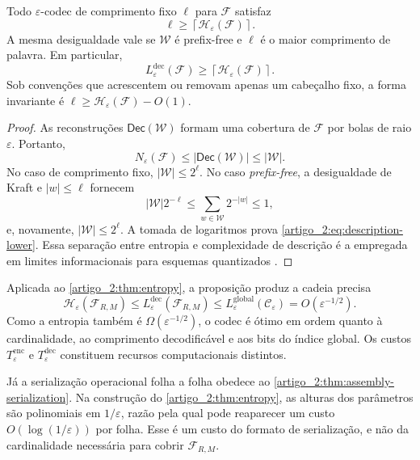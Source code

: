 \begin{proposition}\label{map:artigo_2:3.20}
\label{artigo_2:prop:description-lower}
Todo $\varepsilon$-codec de comprimento fixo $\ell$ para $\mathcal F$ satisfaz
\begin{equation}
 \ell\ge\left\lceil\mathcal H_\varepsilon(\mathcal F)\right\rceil.
 \label{artigo_2:eq:description-lower}
\end{equation}
A mesma desigualdade vale se $\mathcal W$ é prefix-free e $\ell$ é o maior
comprimento de palavra. Em particular,
\[
 L_\varepsilon^{\mathrm{dec}}(\mathcal F)
 \ge\left\lceil\mathcal H_\varepsilon(\mathcal F)\right\rceil.
\]
Sob convenções que acrescentem ou removam apenas um cabeçalho fixo, a forma
invariante é $\ell\ge\mathcal H_\varepsilon(\mathcal F)-O(1)$.
\end{proposition}

\begin{proof}
As reconstruções $\mathsf{Dec}(\mathcal W)$ formam uma cobertura de
$\mathcal F$ por bolas de raio $\varepsilon$. Portanto,
\[
 N_\varepsilon(\mathcal F)
 \le |\mathsf{Dec}(\mathcal W)|\le|\mathcal W|.
\]
No caso de comprimento fixo, $|\mathcal W|\le2^\ell$. No caso \emph{prefix-free}, a
desigualdade de Kraft e $|w|\le\ell$ fornecem
\[
 |\mathcal W|2^{-\ell}
 \le\sum_{w\in\mathcal W}2^{-|w|}\le1,
\]
e, novamente, $|\mathcal W|\le2^\ell$. A tomada de logaritmos prova
\eqref{artigo_2:eq:description-lower}. Essa separação entre entropia e complexidade de
descrição é a empregada em limites informacionais para esquemas quantizados
\citep{artigo_1-bolcskei2019}.
\end{proof}

Aplicada ao \cref{artigo_2:thm:entropy}, a proposição produz a cadeia precisa
\begin{equation}
 \mathcal H_\varepsilon(\mathcal F_{R,M})
 \le L_\varepsilon^{\mathrm{dec}}(\mathcal F_{R,M})
 \le L_\varepsilon^{\mathrm{global}}(\mathcal C_\varepsilon)
 =O(\varepsilon^{-1/2}).
 \label{artigo_2:eq:complexity-chain}
\end{equation}
Como a entropia também é $\Omega(\varepsilon^{-1/2})$, o codec é ótimo em
ordem quanto à cardinalidade, ao comprimento decodificável e aos bits do
índice global. Os custos $T_\varepsilon^{\mathrm{enc}}$ e
$T_\varepsilon^{\mathrm{dec}}$ constituem recursos computacionais distintos.

Já a serialização operacional folha a folha obedece ao
\cref{artigo_2:thm:assembly-serialization}. Na construção do \cref{artigo_2:thm:entropy}, as
alturas dos parâmetros são polinomiais em $1/\varepsilon$, razão pela qual pode
reaparecer um custo $O(\log(1/\varepsilon))$ por folha. Esse é um custo do
formato de serialização, e não da cardinalidade necessária para cobrir
$\mathcal F_{R,M}$.

